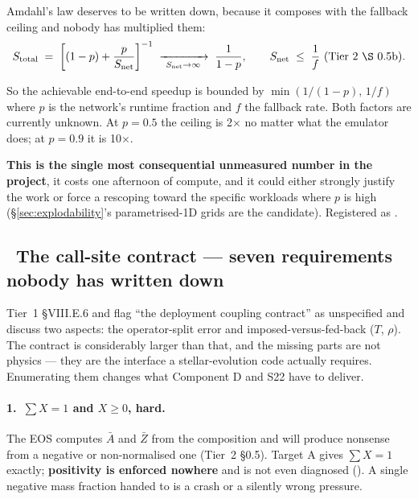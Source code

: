 Amdahl's law deserves to be written down, because it composes with the fallback
ceiling and nobody has multiplied them:
%
\begin{equation}
S_{\mathrm{total}} \;=\; \left[(1-p) + \frac{p}{S_{\mathrm{net}}}\right]^{-1}
\;\xrightarrow[\ S_{\mathrm{net}}\to\infty\ ]{}\; \frac{1}{1-p},
\qquad
S_{\mathrm{net}} \;\le\; \frac{1}{f}\ \text{(Tier~2 \S 0.5b)} .
\label{eq:amdahl}
\end{equation}

So the achievable end-to-end speedup is bounded by
$\min(1/(1-p),\, 1/f)$ where $p$ is the network's runtime fraction and $f$ the
fallback rate. Both factors are currently unknown. At $p = 0.5$ the ceiling is
2$\times$ no matter what the emulator does; at $p = 0.9$ it is 10$\times$.

\textbf{This is the single most consequential unmeasured number in the
project}, it costs one afternoon of compute, and it could either strongly
justify the work or force a rescoping toward the specific workloads where $p$ is
high (\S\ref{sec:explodability}'s parametrised-1D grids are the candidate).
Registered as .

\subsection{\texorpdfstring{\warnglyph{}~}{}The call-site contract --- seven requirements nobody has written down}
\label{sec:callsite}

Tier~1 \S VIII.E.6 and  flag ``the deployment coupling
contract'' as unspecified and discuss two aspects: the operator-split error and
imposed-versus-fed-back ($T$, $\rho$). The contract is considerably larger than
that, and the missing parts are not physics --- they are the interface a
stellar-evolution code actually requires. Enumerating them changes what
Component D and S22 have to deliver.

\paragraph{1.\ $\sum X = 1$ and $X \ge 0$, hard.} The EOS computes $\bar A$ and
$\bar Z$ from the composition and will produce nonsense from a negative or
non-normalised one (Tier~2 \S 0.5). Target A gives $\sum X = 1$ exactly;
\textbf{positivity is enforced nowhere} and is not even diagnosed
(). A single negative mass fraction handed to  is
a crash or a silently wrong pressure.

